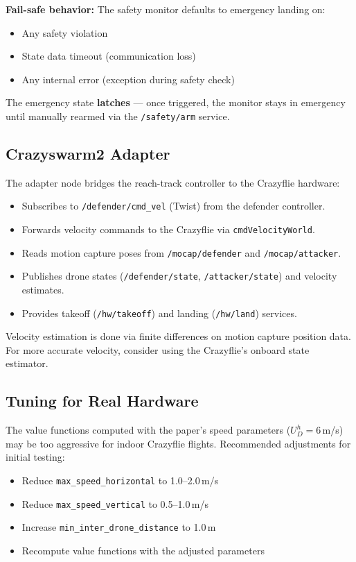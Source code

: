 \documentclass[11pt,a4paper]{article}
\begin{document}
\textbf{Fail-safe behavior:} The safety monitor defaults to emergency landing on:
\begin{itemize}[noitemsep]
    \item Any safety violation
    \item State data timeout (communication loss)
    \item Any internal error (exception during safety check)
\end{itemize}

The emergency state \textbf{latches} --- once triggered, the monitor stays in emergency until manually rearmed via the \texttt{/safety/arm} service.

\subsection{Crazyswarm2 Adapter}

The adapter node bridges the reach-track controller to the Crazyflie hardware:

\begin{itemize}
    \item Subscribes to \texttt{/defender/cmd\_vel} (Twist) from the defender controller.
    \item Forwards velocity commands to the Crazyflie via \texttt{cmdVelocityWorld}.
    \item Reads motion capture poses from \texttt{/mocap/defender} and \texttt{/mocap/attacker}.
    \item Publishes drone states (\texttt{/defender/state}, \texttt{/attacker/state}) and velocity estimates.
    \item Provides takeoff (\texttt{/hw/takeoff}) and landing (\texttt{/hw/land}) services.
\end{itemize}

Velocity estimation is done via finite differences on motion capture position data. For more accurate velocity, consider using the Crazyflie's onboard state estimator.

\subsection{Tuning for Real Hardware}

\begin{warningbox}
The value functions computed with the paper's speed parameters ($U_D^h = 6$\,m/s) may be too aggressive for indoor Crazyflie flights. Recommended adjustments for initial testing:
\begin{itemize}[noitemsep]
    \item Reduce \texttt{max\_speed\_horizontal} to 1.0--2.0\,m/s
    \item Reduce \texttt{max\_speed\_vertical} to 0.5--1.0\,m/s
    \item Increase \texttt{min\_inter\_drone\_distance} to 1.0\,m
    \item Recompute value functions with the adjusted parameters
\end{itemize}
\end{warningbox}
\end{document}
